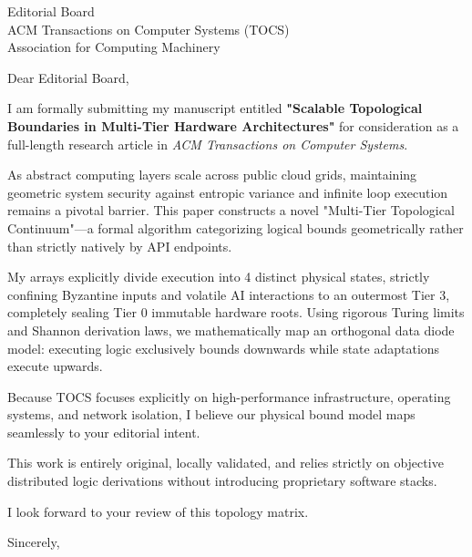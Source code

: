\documentclass[11pt,a4paper]{letter}
\begin{document}
\begin{letter}{Editorial Board \\ ACM Transactions on Computer Systems (TOCS) \\ Association for Computing Machinery}

\opening{Dear Editorial Board,}

I am formally submitting my manuscript entitled \textbf{"Scalable Topological Boundaries in Multi-Tier Hardware Architectures"} for consideration as a full-length research article in \textit{ACM Transactions on Computer Systems}.

As abstract computing layers scale across public cloud grids, maintaining geometric system security against entropic variance and infinite loop execution remains a pivotal barrier. This paper constructs a novel "Multi-Tier Topological Continuum"—a formal algorithm categorizing logical bounds geometrically rather than strictly natively by API endpoints.

My arrays explicitly divide execution into 4 distinct physical states, strictly confining Byzantine inputs and volatile AI interactions to an outermost Tier 3, completely sealing Tier 0 immutable hardware roots. Using rigorous Turing limits and Shannon derivation laws, we mathematically map an orthogonal data diode model: executing logic exclusively bounds downwards while state adaptations execute upwards. 

Because TOCS focuses explicitly on high-performance infrastructure, operating systems, and network isolation, I believe our physical bound model maps seamlessly to your editorial intent.

This work is entirely original, locally validated, and relies strictly on objective distributed logic derivations without introducing proprietary software stacks. 

I look forward to your review of this topology matrix.

\closing{Sincerely,}

\end{letter}
\end{document}
